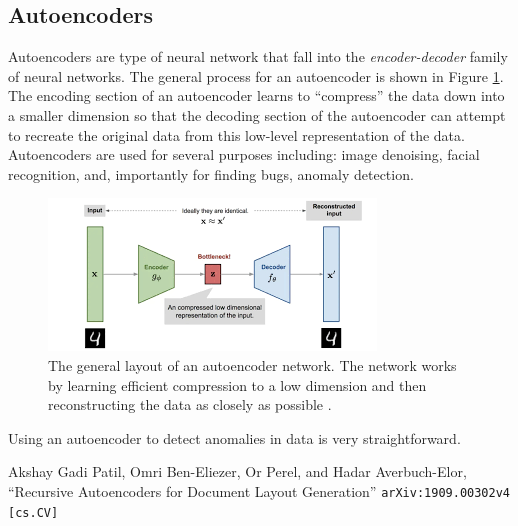 \documentclass[a4paper,11pt]{article}
\begin{document}
\subsection{Autoencoders}
Autoencoders are type of neural network that fall into the \textit{encoder-decoder} family of neural networks. The general process for an autoencoder is shown in Figure \ref{autoencoder_general}. The encoding section of an autoencoder learns to ``compress'' the data down into a smaller dimension so that the decoding section of the autoencoder can attempt to recreate the original data from this low-level representation of the data. Autoencoders are used for several purposes including: image denoising, facial recognition, and, importantly for finding bugs, anomaly detection.
\begin{figure}[H]
\centering
\includegraphics[width=.8\textwidth]{autoencoder_general.png}
\caption{The general layout of an autoencoder network. The network works by learning efficient compression to a low dimension and then reconstructing the data as closely as possible \cite{patil}.}
\label{autoencoder_general}
\end{figure}
Using an autoencoder to detect anomalies in data is very straightforward.

\newpage
\begin{thebibliography}{100}
 Akshay Gadi Patil, Omri Ben-Eliezer, Or Perel, and Hadar Averbuch-Elor, ``Recursive Autoencoders for Document Layout Generation'' {\tt arXiv:1909.00302v4 [cs.CV]}
\end{thebibliography}
\end{document}
